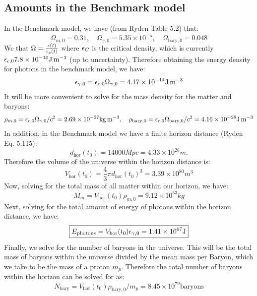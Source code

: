 \subsection{Amounts in the Benchmark model}
In the Benchmark model, we have (from Ryden Table 5.2) that:
\begin{equation}
    \Omega_{m, 0} = 0.31, \quad \Omega_{\gamma, 0} = 5.35 \times 10^{-5},\quad  \Omega_{\text{bary}, 0} = 0.048
\end{equation}
We that $\Omega = \frac{\e(t)}{\e_c(t)}$ where $\e_C$ is the critical density, which is currently $\e_{c, 0} 7.8 \times 10^{-10}\si{J.m^{-3}}$ (up to uncertainty). Therefore obtaining the energy density for photons in the benchmark model, we have:
\begin{equation}
    \e_{\gamma, 0} = \e_{c, 0}\Omega_{\gamma, 0} = 4.17 \times 10^{-14} \si{J.m^{-3}}
\end{equation}
It will be more convenient to solve for the mass density for the matter and baryons:
\begin{equation}
    \rho_{m, 0} = \e_{c, 0}\Omega_{\gamma, 0}/c^2 = 2.69 \times 10^{-27}\si{kg.m^{-3}}, \quad \rho_{\text{bary}, 0} = \e_{c, 0}\Omega_{\text{bary}, 0}/c^2 = 4.16 \times 10^{-28} \si{J.m^{-3}} 
\end{equation}
In addition, in the Benchmark model we have a finite horizon distance (Ryden Eq. 5.115):
\begin{equation}
    d_{\text{hor}}(t_0) = 14000\si{Mpc} = 4.33 \times 10^{26}\si{m}.
\end{equation}
Therefore the volume of the universe within the horizon distance is:
\begin{equation}
    V_{\text{hor}}(t_0) = \frac{4}{3}\pi d_{\text{hor}}(t_0)^3 = 3.39 \times 10^{80} \si{m^3}
\end{equation}
Now, solving for the total mass of all matter within our horizon, we have:
\begin{equation}
    \boxed{M_m =  V_{\text{hor}}(t_0)\rho_{m, 0} = 9.12 \times 10^{53}\si{kg}}
\end{equation}
Next, solving for the total amount of energy of photons within the horizon distance, we have:
\begin{equation}
    \boxed{E_{\text{photons}} = V_{\text{hor}}(t_0)\e_{\gamma, 0} = 1.41 \times 10^{67} \si{J}}
\end{equation}
Finally, we solve for the number of baryons in the universe. This will be the total mass of baryons within the universe divided by the mean mass per Baryon, which we take to be the mass of a proton $m_p$. Therefore the total number of baryons within the horizon can be solved for as:
\begin{equation}
    \boxed{N_{\text{bary}} =  V_{\text{hor}}(t_0)\rho_{\text{bary}, 0}/m_{p} = 8.45 \times 10^{79} \text{baryons}}
\end{equation}

